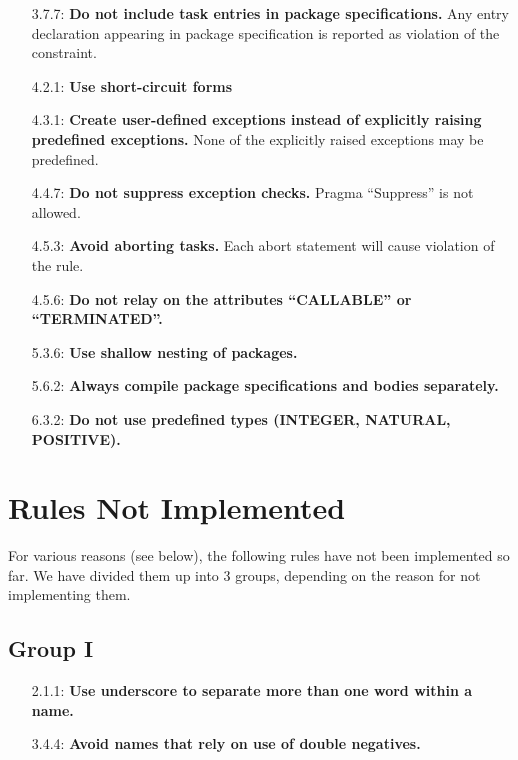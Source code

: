 \begin{itemize}
\item [3.7.7:] {\bf Do not include task entries in package specifications.}
Any entry declaration appearing in package specification is reported as violation of the constraint.

\item [4.2.1:] {\bf Use short-circuit forms}

\item [4.3.1:] {\bf Create user-defined exceptions instead of explicitly raising predefined exceptions.}
None of the explicitly raised exceptions may be predefined.

\item [4.4.7:] {\bf Do not suppress exception checks.}
Pragma ``Suppress'' is not allowed.

\item [4.5.3:] {\bf Avoid aborting tasks.}
Each abort statement will cause violation of the rule.

\item [4.5.6:] {\bf Do not relay on the attributes ``CALLABLE'' or ``TERMINATED''.}

\item  [5.3.6:] {\bf Use shallow nesting of packages.}

\item [5.6.2:] {\bf Always compile package specifications and bodies separately.}

\item [6.3.2:] {\bf Do not use predefined types (INTEGER, NATURAL, POSITIVE).}

\end{itemize}

\section{Rules Not Implemented}

For various reasons (see below), the following rules have not been
implemented so far. We have divided them up into 3 groups, depending
on the reason for not implementing them.

\subsection*{Group I}

\begin{itemize}
\item [2.1.1:] {\bf Use underscore to separate more than one word within a name.}
\item [3.4.4:] {\bf Avoid names that rely on use of double negatives.}
\end{itemize}

